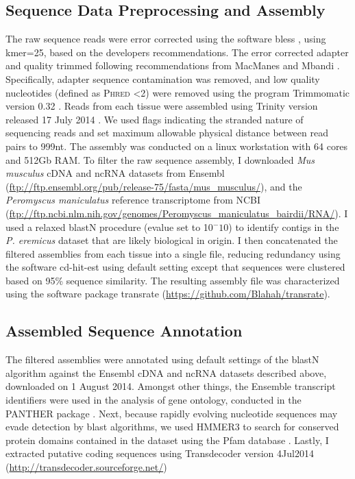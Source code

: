 \documentclass[11pt]{article}
\begin{document}
\subsection*{Sequence Data Preprocessing and Assembly}

The raw sequence reads were error corrected using the software bless \cite{Heo:2014cb}, using kmer=25, based on the developers recommendations. The error corrected adapter and quality trimmed following recommendations from MacManes \cite{MacManes:2014io} and Mbandi \cite{Christoffels:2014bg}. Specifically, adapter sequence contamination was removed, and low quality nucleotides (defined as \textsc{Phred} \textless 2) were removed using the program Trimmomatic version 0.32  \cite{Lohse:2012fg}. Reads from each tissue were assembled using Trinity version released 17 July 2014 \cite{Haas:2013jq}. We used flags indicating the stranded nature of sequencing reads and set maximum allowable physical distance between read pairs to 999nt. The assembly was conducted on a linux workstation with 64 cores and 512Gb RAM. To filter the raw sequence assembly, I downloaded \textit{Mus musculus} cDNA and ncRNA datasets from Ensembl (\url{ftp://ftp.ensembl.org/pub/release-75/fasta/mus_musculus/}), and the \textit{Peromyscus maniculatus} reference transcriptome from NCBI (\url{ftp://ftp.ncbi.nlm.nih.gov/genomes/Peromyscus_maniculatus_bairdii/RNA/}). I used a relaxed blastN procedure (evalue set to 10$^-10$) to identify contigs in the \textit{P. eremicus} dataset that are likely biological in origin. I then concatenated the filtered assemblies from each tissue into a single file, reducing redundancy using the software cd-hit-est \cite{Li:2006hr} using default setting except that sequences were clustered based on 95\% sequence similarity. The resulting assembly file was characterized using the software package transrate (\url{https://github.com/Blahah/transrate}). \\

\subsection*{Assembled Sequence Annotation}



The filtered assemblies were annotated using default settings of the blastN algorithm \cite{Camacho:2009fc} against the Ensembl cDNA and ncRNA datasets described above, downloaded on 1 August 2014. Amongst other things, the Ensemble transcript identifiers were used in the analysis of gene ontology, conducted in the PANTHER package \cite{Mi:2004iv}. Next, because rapidly evolving nucleotide sequences may evade detection by blast algorithms, we used HMMER3 \cite{Wheeler:2013gj} to search for conserved protein domains contained in the dataset using the Pfam database \cite{Punta:2012ko}. Lastly, I extracted putative coding sequences using Transdecoder version 4Jul2014 (\url{http://transdecoder.sourceforge.net/})\\
\end{document}
